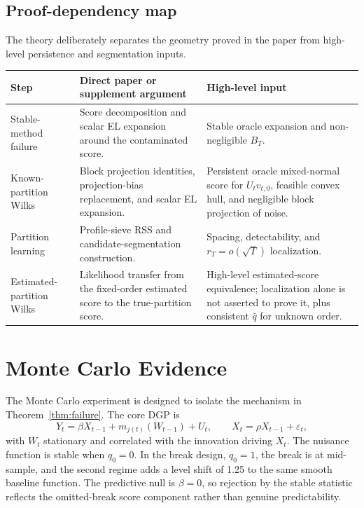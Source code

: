 \documentclass[12pt]{article} %
\numberwithin{equation}{section}
\theoremstyle{definition}
\begin{document}
\subsection*{Proof-dependency map}
The theory deliberately separates the geometry proved in the paper from high-level persistence and segmentation inputs.
\begin{center}
\begin{tabular}{>{\raggedright\arraybackslash}p{}>{\raggedright\arraybackslash}p{}>{\raggedright\arraybackslash}p{}}
\hline
Step & Direct paper or supplement argument & High-level input \\
\hline
Stable-method failure & Score decomposition and scalar EL expansion around the contaminated score. & Stable oracle expansion and non-negligible \(B_T\). \\
Known-partition Wilks & Block projection identities, projection-bias replacement, and scalar EL expansion. & Persistent oracle mixed-normal score for \(U_tv_{t,0}\), feasible convex hull, and negligible block projection of noise. \\
Partition learning & Profile-sieve RSS and candidate-segmentation construction. & Spacing, detectability, and \(r_T=o(\sqrt T)\) localization. \\
Estimated-partition Wilks & Likelihood transfer from the fixed-order estimated score to the true-partition score. & High-level estimated-score equivalence; localization alone is not asserted to prove it, plus consistent \(\widehat q\) for unknown order. \\
\hline
\end{tabular}
\end{center}

\section{Monte Carlo Evidence}
\label{sec:mc}

The Monte Carlo experiment is designed to isolate the mechanism in Theorem~\ref{thm:failure}. The core DGP is
\[
    Y_t
    =
    \beta X_{t-1}
    +
    m_{j(t)}(W_{t-1})
    +
    U_t,
    \qquad
    X_t=\rho X_{t-1}+\varepsilon_t,
\]
with \(W_t\) stationary and correlated with the innovation driving \(X_t\). The nuisance function is stable when \(q_0=0\). In the break design, \(q_0=1\), the break is at mid-sample, and the second regime adds a level shift of 1.25 to the same smooth baseline function. The predictive null is \(\beta=0\), so rejection by the stable statistic reflects the omitted-break score component rather than genuine predictability.
\end{document}
